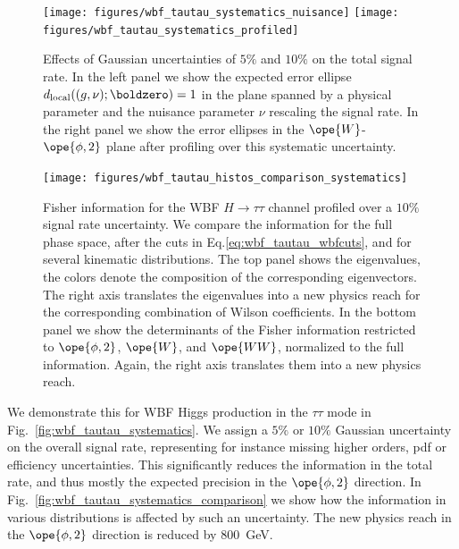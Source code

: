 \begin{figure}
  \centering
  \texttt{[image: figures/wbf\_tautau\_systematics\_nuisance]}
  \hspace*{0.05\textwidth}
  \texttt{[image: figures/wbf\_tautau\_systematics\_profiled]}
  \caption{Effects of Gaussian uncertainties of $5\%$ and $10\%$ on
    the total signal rate. In the left panel we show the expected
    error ellipse $d_{\text{local}}( (g,\nu) ; \boldzero) = 1$ in
    the plane spanned by a physical parameter and the nuisance
    parameter $\nu$ rescaling the signal rate. In the right panel we
    show the error ellipses in the $\ope{W}$-$\ope{\phi,2}$ plane
    after profiling over this systematic uncertainty.}
  \label{fig:information_wbf_tautau_systematics}
\end{figure}

\begin{figure}
  \centering
  \texttt{[image: figures/wbf\_tautau\_histos\_comparison\_systematics]}
  \caption{Fisher information for the WBF $H \to \tau \tau$ channel
    profiled over a $10\%$ signal rate uncertainty. We compare the
    information for the full phase space, after the cuts in
    Eq.\;\eqref{eq:wbf_tautau_wbfcuts}, and for several kinematic
    distributions.  The top panel shows the eigenvalues, the colors
    denote the composition of the corresponding eigenvectors. The
    right axis translates the eigenvalues into a new physics reach for
    the corresponding combination of Wilson coefficients.  In the
    bottom panel we show the determinants of the Fisher information
    restricted to $\ope{\phi,2}$, $\ope{W}$, and $\ope{WW}$,
    normalized to the full information. Again, the right axis
    translates them into a new physics reach.}
  \label{fig:information_wbf_tautau_systematics_comparison}
\end{figure}

We demonstrate this for WBF Higgs production in the $\tau \tau$ mode
in Fig.~\ref{fig:wbf_tautau_systematics}. We assign a $5\%$ or $10\%$
Gaussian uncertainty on the overall signal rate, representing for
instance missing higher orders, pdf or efficiency uncertainties. This
significantly reduces the information in the total rate, and thus
mostly the expected precision in the $\ope{\phi,2}$ direction.  In
Fig.~\ref{fig:wbf_tautau_systematics_comparison} we show how the
information in various distributions is affected by such an
uncertainty. The new physics reach in the $\ope{\phi,2}$ direction is
reduced by 800~GeV. 




